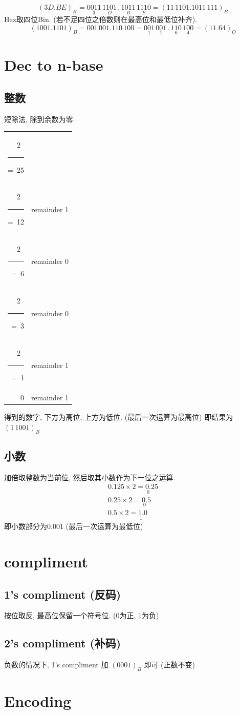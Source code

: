 \documentclass[scheme=chinese,a4paper]{report}
\def\rlwd{.5pt} \def\rlht{2.2ex} \def\rldp{.5ex}
\def\mydiv#1{~%
  \rule[-\rldp]{\rlwd}{\rlht}%
  \setbox0=\hbox{~#1}%
  \stackunder[\dimexpr\rldp-\rlwd]{~#1}{\rule{\wd0}{\rlwd}}%
}
\begin{document}
  $$ (3D.BE)_{H}= \underset{3}{0011} \, \underset{D}{1101} \,.\, \underset{B}{1011}\, \underset{E}{1110}=(11\,1101.1011\,111)_B$$
  Hex取四位Bin. (若不足四位之倍数则在最高位和最低位补齐). 
  $$ (1001.1101)_B=001\,001.110\,100=\underset{1}{001}\,\underset{1}{001}\,.\,\underset{6}{110}\,\underset{4}{100}=(11.64)_O $$
\section{Dec to n-base}
\subsection{整数}
短除法, 除到余数为零. \\
\begin{tabular}{rl} 
2\mydiv{25} &\\
2\mydiv{12}  & remainder 1\\
2\mydiv{6}  & remainder 0\\
2\mydiv{3}   & remainder 0\\
2\mydiv{1}            & remainder 1\\
0&remainder 1
\end{tabular}

得到的数字, 下方为高位, 上方为低位. (最后一次运算为最高位) 即结果为$(1\,1001)_B$
\subsection{小数}
加倍取整数为当前位, 然后取其小数作为下一位之运算. 
\begin{align}
    0.125\times 2 = \underset{0}{0.}25 \\
    0.25\times 2 = \underset{0}{0.}5\\
    0.5\times 2=\underset{1}{1.}0
\end{align}
即小数部分为$0.001$ (最后一次运算为最低位)
\section{compliment}
\subsection{1's compliment (反码)}
按位取反, 最高位保留一个符号位. (0为正, 1为负)
\subsection{2's compliment (补码)}
负数的情况下, 1's compliment 加 $ (0001)_B $ 即可 (正数不变)
\section{Encoding}
\end{document}
